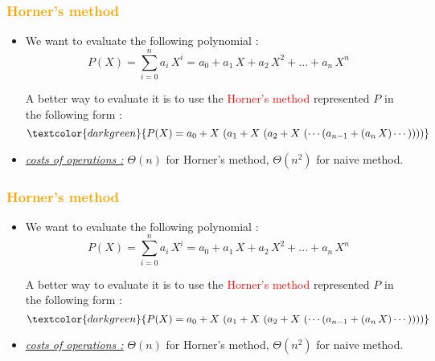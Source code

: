 \begin{frame}[fragile]
\frametitle{\textbf{\textcolor{orange}{Horner's method}}}

\begin{itemize}
\item We want to evaluate the following polynomial :
$$P(X) = \sum_{i=0}^{n} a_i\, X^i = a_0 + a_1\, X + a_2\, X^2 + ... + a_n\, X^n$$

A better way to evaluate it is to use the \textcolor{red}{Horner's method} represented $P$ in the following form :
$$\textcolor{darkgreen}{P(X) = a_0 + X\, \left(a_1 + X\, \left(a_2 + X\,\left(\cdots \left(a_{n-1} + \left(a_n\, X\right)\cdots \right)\right)\right)\right)}$$

\item \underline{\textit{costs of operations :}} $\Theta(n)$ for Horner's method, $\Theta(n^2)$ for naive method.
\end{itemize}

\end{frame}

\begin{frame}[fragile]
\frametitle{\textbf{\textcolor{orange}{Horner's method}}}

\begin{itemize}
\item We want to evaluate the following polynomial :
$$P(X) = \sum_{i=0}^{n} a_i\, X^i = a_0 + a_1\, X + a_2\, X^2 + ... + a_n\, X^n$$

A better way to evaluate it is to use the \textcolor{red}{Horner's method} represented $P$ in the following form :
$$\textcolor{darkgreen}{P(X) = a_0 + X\, \left(a_1 + X\, \left(a_2 + X\,\left(\cdots \left(a_{n-1} + \left(a_n\, X\right)\cdots \right)\right)\right)\right)}$$

\item \underline{\textit{costs of operations :}} $\Theta(n)$ for Horner's method, $\Theta(n^2)$ for naive method.
\end{itemize}

\end{frame}
